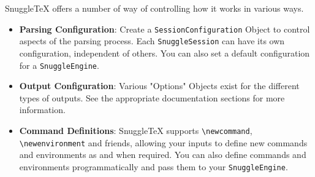
SnuggleTeX offers a number of way of controlling how it works in various
ways.

\begin{itemize}

\item \textbf{Parsing Configuration}: Create a \verb|SessionConfiguration| Object to control
  aspects of the parsing process. Each \verb|SnuggleSession| can have
  its own configuration, independent of others. You can also set a default
  configuration for a \verb|SnuggleEngine|.

\item \textbf{Output Configuration}: Various "Options" Objects exist for the different
  types of outputs. See the appropriate documentation sections for more information.

\item \textbf{Command Definitions}: SnuggleTeX supports \verb|\newcommand|,
  \verb|\newenvironment| and friends, allowing your inputs to define new commands
  and environments as and when required. You can also define commands and environments
  programmatically and pass them to your \verb|SnuggleEngine|.

\end{itemize}
